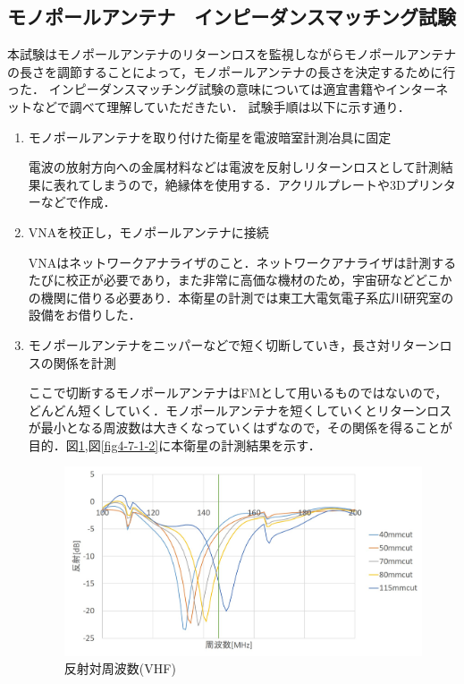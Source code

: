 \subsection{モノポールアンテナ　インピーダンスマッチング試験}
本試験はモノポールアンテナのリターンロスを監視しながらモノポールアンテナの長さを調節することによって，モノポールアンテナの長さを決定するために行った．
インピーダンスマッチング試験の意味については適宜書籍やインターネットなどで調べて理解していただきたい．
試験手順は以下に示す通り．
\begin{enumerate}
	\item モノポールアンテナを取り付けた衛星を電波暗室計測冶具に固定\par
	\quad 電波の放射方向への金属材料などは電波を反射しリターンロスとして計測結果に表れてしまうので，絶縁体を使用する．アクリルプレートや3Dプリンターなどで作成．
	\item VNAを校正し，モノポールアンテナに接続\par
	\quad VNAはネットワークアナライザのこと．ネットワークアナライザは計測するたびに校正が必要であり，また非常に高価な機材のため，宇宙研などどこかの機関に借りる必要あり．本衛星の計測では東工大電気電子系広川研究室の設備をお借りした．
	\item モノポールアンテナをニッパーなどで短く切断していき，長さ対リターンロスの関係を計測\par
	\quad ここで切断するモノポールアンテナはFMとして用いるものではないので，どんどん短くしていく．モノポールアンテナを短くしていくとリターンロスが最小となる周波数は大きくなっていくはずなので，その関係を得ることが目的．図\ref{fig4-7-1},図\ref{fig4-7-1-2}に本衛星の計測結果を示す．
	\begin{figure}[H]
		\centering
		\includegraphics[scale=0.5]{04/fig/4-7-1.jpg}
		\caption{反射対周波数(VHF)}
		\label{fig4-7-1}
	\end{figure}
	\begin{figure}[H]

\end{figure}
\end{enumerate}
